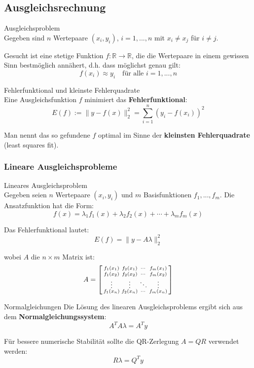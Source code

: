 \subsection{Ausgleichsrechnung}

\begin{definition}{Ausgleichsproblem}\\
Gegeben sind $n$ Wertepaare $(x_i, y_i)$, $i = 1, ..., n$ mit $x_i \neq x_j$ für $i \neq j$.

Gesucht ist eine stetige Funktion $f: \mathbb{R} \rightarrow \mathbb{R}$, die die Wertepaare in einem gewissen Sinn bestmöglich annähert, d.h. dass möglichst genau gilt:
$$f(x_i) \approx y_i \quad \text{für alle } i = 1, ..., n$$
\end{definition}

\begin{concept}{Fehlerfunktional und kleinste Fehlerquadrate}\\
Eine Ausgleichsfunktion $f$ minimiert das \textbf{Fehlerfunktional}:
$$E(f) := \|y - f(x)\|_2^2 = \sum_{i=1}^{n} (y_i - f(x_i))^2$$

Man nennt das so gefundene $f$ optimal im Sinne der \textbf{kleinsten Fehlerquadrate} (least squares fit).
\end{concept}

\subsubsection{Lineare Ausgleichsprobleme}

\begin{definition}{Lineares Ausgleichsproblem}\\
Gegeben seien $n$ Wertepaare $(x_i, y_i)$ und $m$ Basisfunktionen $f_1, ..., f_m$. Die Ansatzfunktion hat die Form:
$$f(x) = \lambda_1 f_1(x) + \lambda_2 f_2(x) + \cdots + \lambda_m f_m(x)$$

Das Fehlerfunktional lautet:
$$E(f) = \|y - A\lambda\|_2^2$$

wobei $A$ die $n \times m$ Matrix ist:
$$A = \begin{bsmallmatrix}
f_1(x_1) & f_2(x_1) & \cdots & f_m(x_1) \\
f_1(x_2) & f_2(x_2) & \cdots & f_m(x_2) \\
\vdots & \vdots & \ddots & \vdots \\
f_1(x_n) & f_2(x_n) & \cdots & f_m(x_n)
\end{bsmallmatrix}$$
\end{definition}

\begin{theorem}{Normalgleichungen}
Die Lösung des linearen Ausgleichsproblems ergibt sich aus dem \textbf{Normalgleichungssystem}:
$$A^T A \lambda = A^T y$$

Für bessere numerische Stabilität sollte die QR-Zerlegung $A = QR$ verwendet werden:
$$R\lambda = Q^T y$$
\end{theorem}

